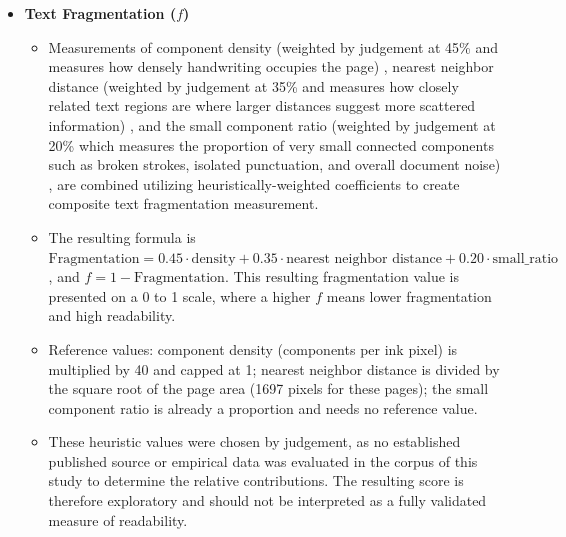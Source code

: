\documentclass[conference]{IEEEtran}
\begin{document}
\begin{itemize}
  \item \textbf{Text Fragmentation ($f$)}
  \begin{itemize}
    \item Measurements of component density (weighted by judgement at 45\% and
    measures how densely handwriting occupies the page) \cite{fujisawa1992},
    nearest neighbor distance (weighted by judgement at 35\% and measures how
    closely related text regions are where larger distances suggest more
    scattered information) \cite{ogorman1993, clark1954}, and the small
    component ratio (weighted by judgement at 20\% which measures the
    proportion of very small connected components such as broken strokes,
    isolated punctuation, and overall document noise)
    \cite{fujisawa1992, ye2013}, are combined utilizing heuristically-weighted
    coefficients to create composite text fragmentation measurement.
    \item The resulting formula is
    $\text{Fragmentation} = 0.45 \cdot \text{density} + 0.35 \cdot
    \text{nearest neighbor distance} + 0.20 \cdot \text{small\_ratio}$,
    and $f = 1 - \text{Fragmentation}$. This resulting fragmentation value is
    presented on a 0 to 1 scale, where a higher $f$ means lower fragmentation
    and high readability.
    \item Reference values: component density (components per ink pixel) is
    multiplied by 40 and capped at 1; nearest neighbor distance is divided by
    the square root of the page area (1697 pixels for these pages); the small
    component ratio is already a proportion and needs no reference value.
    \item These heuristic values were chosen by judgement, as no established
    published source or empirical data was evaluated in the corpus of this
    study to determine the relative contributions. The resulting score is
    therefore exploratory and should not be interpreted as a fully validated
    measure of readability.
  \end{itemize}
\end{itemize}
\end{document}
